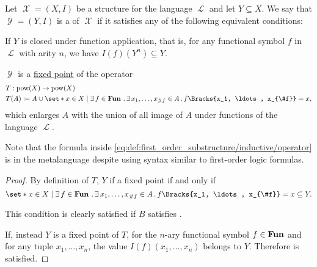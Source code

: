 \begin{definition}\label{def:first_order_substructure}
  Let \( \mscrX = (X, I) \) be a structure for the language \( \mscrL \) and let \( Y \subseteq X \). We say that \( \mscrY = (Y, I) \) is a  of \( \mscrX \) if it satisfies any of the following equivalent conditions:

  \begin{thmenum}
     If \( Y \) is closed under function application, that is, for any functional symbol \( f \) in \( \mscrL \) with arity \( n \), we have \( I(f)(Y^n) \subseteq Y \).

     \( \mscrY \) is a \hyperref[def:fixed_point]{fixed point} of the operator
    \begin{equation}\label{eq:def:first_order_substructure/inductive/operator}
      \begin{aligned}
        &T: \pow(X) \to \pow(X) \\
        &T(A) \coloneqq A \cup \set*{ x \in X \given \qexists{f \in \boldop{Fun}} \qexists{x_1, \ldots, x_{\#f} \in A} f\Bracks{x_1, \ldots, x_{\#f}} = x },
      \end{aligned}
    \end{equation}
    which enlarges \( A \) with the union of all image of \( A \) under functions of the language \( \mscrL \).

    Note that the formula inside \eqref{eq:def:first_order_substructure/inductive/operator} is in the metalanguage despite using syntax similar to first-order logic formulas.
  \end{thmenum}
\end{definition}
\begin{proof}
  By definition of \( T \), \( Y \) if a fixed point if and only if
  \begin{equation*}
    \set*{ x \in X \given \qexists{f \in \boldop{Fun}} \qexists{x_1, \ldots, x_{\#f} \in A} f\Bracks{x_1, \ldots, x_{\#f}} = x } \subseteq Y.
  \end{equation*}

  This condition is clearly satisfied if \( B \) satisfies .

  If, instead \( Y \) is a fixed point of \( T \), for the \( n \)-ary functional symbol \( f \in \operatorname{\mathbf{Fun}} \) and for any tuple \( x_1, \ldots, x_n \), the value \( I(f)(x_1, \ldots, x_n) \) belongs to \( Y \). Therefore  is satisfied.
\end{proof}

